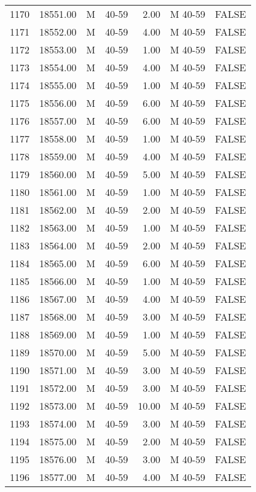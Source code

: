 \begin{table}[ht]
\begin{tabular}{rrllrll}
  1170 & 18551.00 & M & 40-59 & 2.00 & M 40-59 & FALSE \\ 
  1171 & 18552.00 & M & 40-59 & 4.00 & M 40-59 & FALSE \\ 
  1172 & 18553.00 & M & 40-59 & 1.00 & M 40-59 & FALSE \\ 
  1173 & 18554.00 & M & 40-59 & 4.00 & M 40-59 & FALSE \\ 
  1174 & 18555.00 & M & 40-59 & 1.00 & M 40-59 & FALSE \\ 
  1175 & 18556.00 & M & 40-59 & 6.00 & M 40-59 & FALSE \\ 
  1176 & 18557.00 & M & 40-59 & 6.00 & M 40-59 & FALSE \\ 
  1177 & 18558.00 & M & 40-59 & 1.00 & M 40-59 & FALSE \\ 
  1178 & 18559.00 & M & 40-59 & 4.00 & M 40-59 & FALSE \\ 
  1179 & 18560.00 & M & 40-59 & 5.00 & M 40-59 & FALSE \\ 
  1180 & 18561.00 & M & 40-59 & 1.00 & M 40-59 & FALSE \\ 
  1181 & 18562.00 & M & 40-59 & 2.00 & M 40-59 & FALSE \\ 
  1182 & 18563.00 & M & 40-59 & 1.00 & M 40-59 & FALSE \\ 
  1183 & 18564.00 & M & 40-59 & 2.00 & M 40-59 & FALSE \\ 
  1184 & 18565.00 & M & 40-59 & 6.00 & M 40-59 & FALSE \\ 
  1185 & 18566.00 & M & 40-59 & 1.00 & M 40-59 & FALSE \\ 
  1186 & 18567.00 & M & 40-59 & 4.00 & M 40-59 & FALSE \\ 
  1187 & 18568.00 & M & 40-59 & 3.00 & M 40-59 & FALSE \\ 
  1188 & 18569.00 & M & 40-59 & 1.00 & M 40-59 & FALSE \\ 
  1189 & 18570.00 & M & 40-59 & 5.00 & M 40-59 & FALSE \\ 
  1190 & 18571.00 & M & 40-59 & 3.00 & M 40-59 & FALSE \\ 
  1191 & 18572.00 & M & 40-59 & 3.00 & M 40-59 & FALSE \\ 
  1192 & 18573.00 & M & 40-59 & 10.00 & M 40-59 & FALSE \\ 
  1193 & 18574.00 & M & 40-59 & 3.00 & M 40-59 & FALSE \\ 
  1194 & 18575.00 & M & 40-59 & 2.00 & M 40-59 & FALSE \\ 
  1195 & 18576.00 & M & 40-59 & 3.00 & M 40-59 & FALSE \\ 
  1196 & 18577.00 & M & 40-59 & 4.00 & M 40-59 & FALSE \\ 

\end{tabular}
\end{table}
